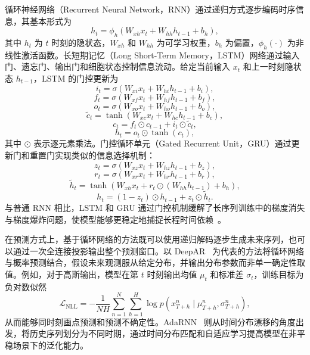 循环神经网络（Recurrent Neural Network，RNN）通过递归方式逐步编码时序信息，其基本形式为
\begin{equation}
h_t = \phi_h\!\left(W_{xh} x_t + W_{hh} h_{t-1} + b_h\right),
\end{equation}
其中 $h_t$ 为 $t$ 时刻的隐状态，$W_{xh}$ 和 $W_{hh}$ 为可学习权重，$b_h$ 为偏置，$\phi_h(\cdot)$ 为非线性激活函数。长短期记忆（Long Short-Term Memory，LSTM）网络通过输入门、遗忘门、输出门和细胞状态控制信息流动。给定当前输入 $x_t$ 和上一时刻隐状态 $h_{t-1}$，LSTM 的门控更新为
\begin{equation}
i_t = \sigma\!\left(W_{xi} x_t + W_{hi} h_{t-1} + b_i\right),
\end{equation}
\begin{equation}
f_t = \sigma\!\left(W_{xf} x_t + W_{hf} h_{t-1} + b_f\right),
\end{equation}
\begin{equation}
o_t = \sigma\!\left(W_{xo} x_t + W_{ho} h_{t-1} + b_o\right),
\end{equation}
\begin{equation}
\tilde{c}_t = \tanh\!\left(W_{xc} x_t + W_{hc} h_{t-1} + b_c\right),
\end{equation}
\begin{equation}
c_t = f_t \odot c_{t-1} + i_t \odot \tilde{c}_t,
\end{equation}
\begin{equation}
h_t = o_t \odot \tanh\!\left(c_t\right),
\end{equation}
其中 $\odot$ 表示逐元素乘法。门控循环单元（Gated Recurrent Unit，GRU）通过更新门和重置门实现类似的信息选择机制：
\begin{equation}
z_t = \sigma\!\left(W_{xz} x_t + W_{hz} h_{t-1} + b_z\right),
\end{equation}
\begin{equation}
r_t = \sigma\!\left(W_{xr} x_t + W_{hr} h_{t-1} + b_r\right),
\end{equation}
\begin{equation}
\tilde{h}_t = \tanh\!\left(W_{xh} x_t + r_t \odot \left(W_{hh} h_{t-1}\right) + b_h\right),
\end{equation}
\begin{equation}
h_t = \left(1 - z_t\right) \odot h_{t-1} + z_t \odot \tilde{h}_t.
\end{equation}
与普通 RNN 相比，LSTM 和 GRU 通过门控机制缓解了长序列训练中的梯度消失与梯度爆炸问题，使模型能够更稳定地捕捉长程时间依赖~\cite{deepar,mixrnn+}。

在预测方式上，基于循环网络的方法既可以使用递归解码逐步生成未来序列，也可以通过一次全连接投影输出整个预测窗口。以 DeepAR~\cite{deepar} 为代表的方法将循环网络与概率预测结合，假设未来观测服从给定分布，并输出分布参数而非单一确定性取值。例如，对于高斯输出，模型在第 $t$ 时刻输出均值 $\mu_t$ 和标准差 $\sigma_t$，训练目标为负对数似然
\begin{equation}
\mathcal{L}_{\mathrm{NLL}} = -\frac{1}{NH} \sum_{n=1}^{N} \sum_{h=1}^{H}
\log p\!\left(x_{T+h}^{n} \mid \mu_{T+h}^{n}, \sigma_{T+h}^{n}\right),
\end{equation}
从而能够同时刻画点预测和预测不确定性。AdaRNN~\cite{adarnn} 则从时间分布漂移的角度出发，将历史序列划分为不同时期，通过时间分布匹配和自适应学习提高模型在非平稳场景下的泛化能力。

